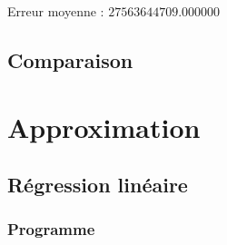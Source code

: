 \documentclass{report}
\begin{document}
      Erreur moyenne : $27563644709.000000$
      
      
      \renewcommand{\arraystretch}{2}
      \renewcommand{\arraystretch}{1}
    \newpage
    \section{Comparaison}
  \chapter{Approximation}
    \section{Régression linéaire}
      \subsection{Programme}
	
    \newpage
\end{document}
